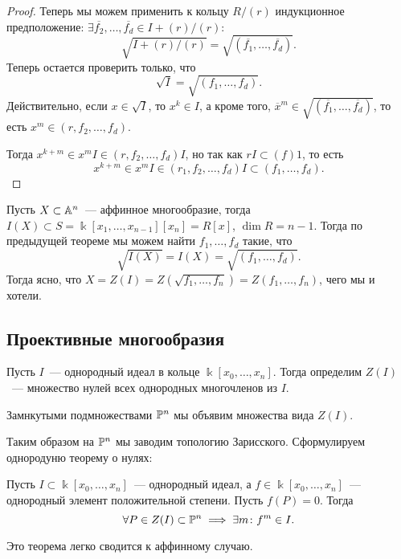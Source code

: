 \begin{proof}
  		Теперь мы можем применить к кольцу $R/(r)$ индукционное предположение: $\exists \overline{f_2}, \ldots, \overline{f_d} \in I + (r)/(r)\colon$
  		\[
  			\sqrt{I + (r)/(r)} = \sqrt{(\overline{f_1}, \ldots, \overline{f_d})}.
  		\]
 		Теперь остается проверить только, что 
 		\[
 			\sqrt{I} = \sqrt{(f_1, \ldots, f_d)}.
 		\]
 		Действительно, если $x \in \sqrt{I}$, то $x^k \in I$, а кроме того, $\overline{x}^m \in \sqrt{(\overline{f_1}, \ldots, \overline{f_d})}$, то есть $x^m \in (r, f_2, \ldots, f_d)$.

 		Тогда $x^{k + m} \in x^m I \in (r, f_2, \ldots, f_d)I$, но так как $rI \subset (f)1$, то есть 
 		\[
 			x^{k + m} \in x^m I \in (r_1, f_2, \ldots, f_d)I \subset (f_1, \ldots, f_d). 
 		\]

 	\end{proof}

 	Пусть $X \subset \AA^n$~--- аффинное многообразие, тогда $I(X) \subset S = \Bbbk[x_1, \ldots, x_{n - 1}][x_n] = R[x]$, $\dim{R} = n - 1$. Тогда по предыдущей теореме мы можем найти $f_1, \ldots, f_d$ такие, что 
 	\[
 		\sqrt{I(X)} = I(X) = \sqrt{(f_1, \ldots, f_d)}. 
 	\]
 	Тогда ясно, что $X = Z(I) = Z(\sqrt{f_1, \ldots, f_n}) = Z(f_1, \ldots, f_n)$, чего мы и хотели. 

 	\subsection{Проективные многообразия}

 	\begin{definition} 
 		Пусть $I$~--- однородный идеал в кольце $\Bbbk[x_0, \ldots, x_{n}]$. Тогда определим $Z(I)$~--- множество нулей всех однородных многочленов из $I$. 
 		
 		Замнкутыми подмножествами $\PP^n$ мы объявим множества вида $Z(I)$.
 	\end{definition}

 	Таким образом на $\PP^n$ мы заводим топологию Зарисского. Сформулируем однородуню теорему о нулях: 

 	\begin{theorem} 
 		Пусть $I \subset \Bbbk[x_0, \ldots, x_n]$~--- однородный идеал, а $f \in \Bbbk[x_0, \ldots, x_n]$~--- однородный элемент положительной степени. Пусть $f(P) = 0$. Тогда 
 		\[
 			\forall P \in Z(I) \subset \PP^n \implies \exists m \colon f^m \in I.
 		\]
 	\end{theorem}

 	Это теорема легко сводится к аффинному случаю. 

